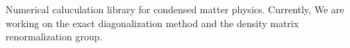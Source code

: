 \label{index_md_README}%
%
Numerical caluculation library for condensed matter physics. Currently, We are working on the exact diagonalization method and the density matrix renormalization group. 
